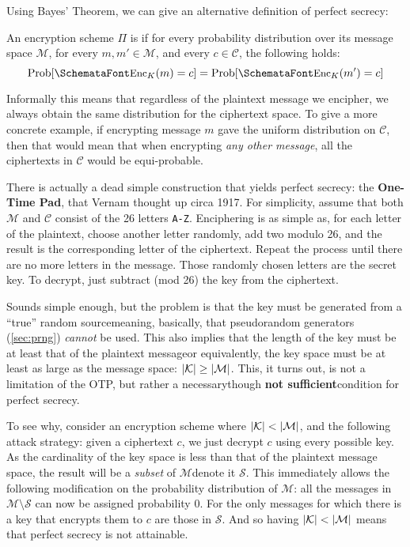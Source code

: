   Using Bayes' Theorem, we can give an alternative definition of perfect secrecy:
  \begin{theorem}
    \label{thm:perf_sec}
    An encryption scheme $\Pi$ is  if for every probability distribution over its message space $\mathcal{M}$, for every $m, m'\in \mathcal{M}$, and every $c\in \mathcal{C}$, the following holds:
    \begin{equation}
      \textup{Prob}[\sgg{Enc}_K(m) = c] = \textup{Prob}[\sgg{Enc}_K(m') = c]
    \end{equation}
  \end{theorem}
  \noindent Informally this means that regardless of the plaintext message we encipher, we always obtain the same distribution for the ciphertext space. To give a more concrete example, if encrypting message $m$ gave the uniform distribution on $\mathcal{C}$, then that would mean that when encrypting \emph{any other message}, all the ciphertexts in $\mathcal{C}$ would be equi-probable.
  
  \bigskip

   There is actually a dead simple construction that yields perfect secrecy: the \textbf{One-Time Pad}, that Vernam thought up circa 1917. For simplicity, assume that both $\mathcal{M}$ and $\mathcal{C}$ consist of the 26 letters \texttt{A-Z}. Enciphering is as simple as, for each letter of the plaintext, choose another letter randomly, add two modulo 26, and the result is the corresponding letter of the ciphertext. Repeat the process until there are no more letters in the message. Those randomly chosen letters are the secret key. To decrypt, just subtract (mod 26) the key from the ciphertext.

  Sounds simple enough, but the problem is that the key must be generated from a ``true'' random source\emd meaning, basically, that pseudorandom generators (\ts\ref{sec:prng}) \emph{cannot} be used. This also implies that the length of the key must be at least that of the plaintext message\emd or equivalently, the key space must be at least as large as the message space: $\lvert\mathcal{K}\rvert \ge \lvert\mathcal{M}\rvert$. This, it turns out, is not a limitation of the OTP, but rather a necessary\emd though \textbf{not sufficient}\emd condition for perfect secrecy.

  To see why, consider an encryption scheme where $\lvert\mathcal{K}\rvert < \lvert\mathcal{M}\rvert$, and the following attack strategy: given a ciphertext $c$, we just decrypt $c$ using every possible key. As the cardinality of the key space is less than that of the plaintext message space, the result will be a \emph{subset} of $\mathcal{M}$\emd denote it $\mathcal{S}$. This immediately allows the following modification on the probability distribution of $\mathcal{M}$: all the messages in $\mathcal{M}\setminus \mathcal{S}$ can now be assigned probability $0$. For the only messages for which there is a key that encrypts them to $c$ are those in $\mathcal{S}$. And so having $\lvert\mathcal{K}\rvert < \lvert\mathcal{M}\rvert$ means that perfect secrecy is not attainable.

